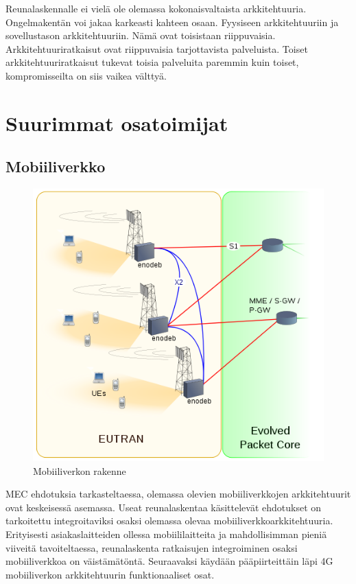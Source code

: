 \documentclass[finnish]{tktltiki2}
\theoremstyle{definition}
\theoremstyle{remark}
\begin{document}
Reunalaskennalle ei vielä ole olemassa kokonaisvaltaista arkkitehtuuria.
Ongelmakentän voi jakaa karkeasti kahteen osaan. Fyysiseen arkkitehtuuriin ja sovellustason arkkitehtuuriin. Nämä ovat toisistaan riippuvaisia.
Arkkitehtuuriratkaisut ovat riippuvaisia tarjottavista palveluista. Toiset arkkitehtuuriratkaisut tukevat toisia palveluita paremmin kuin toiset, kompromisseilta on siis vaikea välttyä.


\section{Suurimmat osatoimijat}
\subsection{Mobiiliverkko}
\begin{figure}[htb]
\includegraphics[scale=0.5]{EUTRAN}
\caption{Mobiiliverkon rakenne} \label{ekakuva}
\end{figure}

MEC ehdotuksia tarkasteltaessa, olemassa olevien mobiiliverkkojen arkkitehtuurit ovat keskeisessä asemassa. Useat reunalaskentaa käsittelevät ehdotukset on tarkoitettu integroitaviksi osaksi olemassa olevaa mobiiliverkkoarkkitehtuuria. 
Erityisesti asiakaslaitteiden ollessa mobiililaitteita ja mahdollisimman pieniä viiveitä tavoiteltaessa, reunalaskenta ratkaisujen integroiminen osaksi mobiiliverkkoa on väistämätöntä. Seuraavaksi käydään pääpiirteittäin läpi 4G mobiiliverkon arkkitehtuurin funktionaaliset osat.
\end{document}
